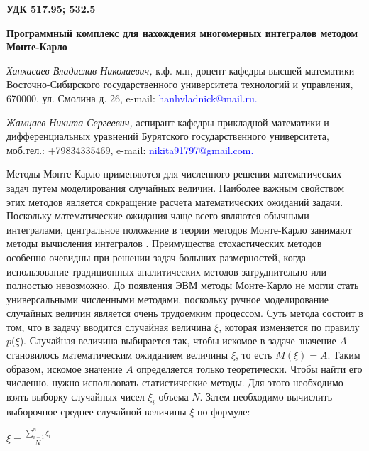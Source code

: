\documentclass{article}
\begin{document}
	
	\begin{flushleft}
	{\bf 	УДК 517.95; 532.5 }   
	\end{flushleft}
	\begin{center}
	\textbf{Программный комплекс для нахождения многомерных интегралов методом Монте-Карло}
	\end{center}

    \textit{Ханхасаев Владислав Николаевич,} к.ф.-м.н, доцент кафедры высшей математики Восточно-Сибирского государственного университета технологий и управления, 670000, ул. Смолина д. 26, e-mail: \textcolor{blue}{ hanhvladnick@mail.ru.} 
    
    \textit{Жамцаев Никита Сергеевич, }аспирант кафедры прикладной математики и дифференциальных уравнений Бурятского государственного университета, моб.тел.: +79834335469, e-mail: \textcolor{blue}{ nikita91797@gmail.com.}  
    
    \vspace*{5mm}
    Методы Монте-Карло применяются для численного решения математических задач путем моделирования случайных величин. Наиболее важным свойством этих методов является сокращение расчета математических ожиданий задачи. Поскольку математические ожидания чаще всего являются обычными интегралами, центральное положение в теории методов Монте-Карло занимают методы вычисления интегралов \cite{litlink1}. 
    Преимущества стохастических методов особенно очевидны при решении задач больших размерностей, когда использование традиционных аналитических методов затруднительно или полностью невозможно. До появления ЭВМ методы Монте-Карло не могли стать универсальными численными методами, поскольку ручное моделирование случайных величин является очень трудоемким процессом.
    Суть метода состоит в том, что в задачу вводится случайная величина $\xi$, которая изменяется по правилу $p(\xi$). Случайная величина выбирается так, чтобы искомое в задаче значение $A$ становилось математическим ожиданием \cite{litlink2} величины $\xi$, то есть $M(\xi) = A$.
    Таким образом, искомое значение $A$ определяется только теоретически. Чтобы найти его численно, нужно использовать статистические методы. Для этого необходимо взять выборку случайных чисел $\xi_i$ объема $N$. Затем необходимо вычислить выборочное среднее случайной величины $\xi$ по формуле:
    
    \begin{center}
    $	\overline{\xi} = \frac{\sum_{i=1}^n \xi_i}{N}$
    \end{center}
    
\end{document}

